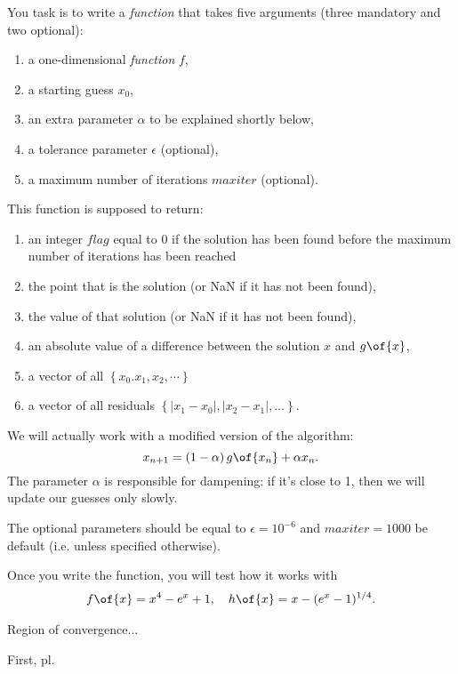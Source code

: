 \documentclass[english,hyperref={pdftex,pdfpagemode=UseNone,hidelinks}]{tufte-handout}
\begin{document}
You task is to write
a \emph{function} that takes five arguments (three mandatory and two optional): 
\begin{enumerate}
\item a one-dimensional \emph{function} $f$, 
\item a starting guess $x_{0}$,
\item an extra parameter $\alpha$ to be explained shortly below, 
\item a tolerance parameter $\epsilon$ (optional), 
\item a maximum number of iterations $maxiter$ (optional). 
\end{enumerate}
This function is supposed to return: 
\begin{enumerate}
\item an integer $flag$ equal to 0 if the solution has been found before
the maximum number of iterations has been reached
\item the point that is the solution (or NaN if it has not been found),
\item the value of that solution (or NaN if it has not been found), 
\item an absolute value of a difference between the solution $x$ and $g\of{x}$, 
\item a vector of all $\left\{ x_{0}.x_{1},x_{2},\cdots\right\} $
\item a
vector of all residuals $\left\{ \left|x_{1}-x_{0}\right|,\left|x_{2}-x_{1}\right|,\ldots\right\} $.
\end{enumerate}
We will actually work with a modified version of the algorithm: 
\[
x_{n+1}=\left(1-\alpha\right)g\of{x_n}+\alpha x_{n}.
\]
The parameter $\alpha$ is responsible for dampening: if it's close
to 1, then we will update our guesses only slowly. 

The optional parameters should be equal to $\epsilon=10^{-6}$ and $maxiter=1000$ be default (i.e. unless specified otherwise).



Once you write the function, you will test how it works with
\begin{align*}
    f\of{x}  = x^4 - e^x + 1, \quad h\of{x} = x - (e^x - 1)^{1/4}.
\end{align*}


Region of convergence... 

First, pl. 
\end{document}

